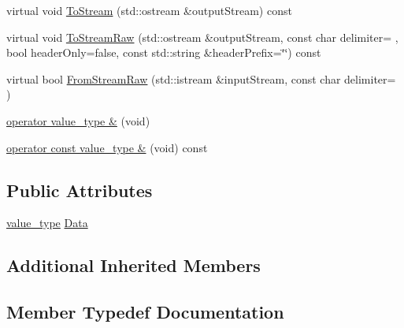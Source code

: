 \begin{DoxyCompactItemize}
virtual void \hyperlink{classmts_generic_object_proxy_a198823be05cc4e5e0af85d8a5f02d42a}{To\+Stream} (std\+::ostream \&output\+Stream) const 
\item 
virtual void \hyperlink{classmts_generic_object_proxy_a96c250631c96b2b63338e3304da78777}{To\+Stream\+Raw} (std\+::ostream \&output\+Stream, const char delimiter= \textquotesingle{} \textquotesingle{}, bool header\+Only=false, const std\+::string \&header\+Prefix=\char`\"{}\char`\"{}) const 
\item 
virtual bool \hyperlink{classmts_generic_object_proxy_a42a8b93d9101b6112b6845d5e42c3969}{From\+Stream\+Raw} (std\+::istream \&input\+Stream, const char delimiter= \textquotesingle{} \textquotesingle{})
\end{DoxyCompactItemize}
{\bf }\par
\begin{DoxyCompactItemize}
\item 
\hyperlink{classmts_generic_object_proxy_aef0697bd0bbbed1452a36e9fc9809905}{operator value\+\_\+type \&} (void)
\item 
\hyperlink{classmts_generic_object_proxy_aab317b5dc0c85123eaf55d3e4237bab5}{operator const value\+\_\+type \&} (void) const 
\end{DoxyCompactItemize}

\subsection*{Public Attributes}
\begin{DoxyCompactItemize}
\item 
\hyperlink{classmts_generic_object_proxy_a4c47d4b184e02d7443de1face033af34}{value\+\_\+type} \hyperlink{classmts_generic_object_proxy_a577e49255c24db1f0573c99de275b339}{Data}
\end{DoxyCompactItemize}
\subsection*{Additional Inherited Members}


\subsection{Member Typedef Documentation}
\hypertarget{classmts_generic_object_proxy_a8635f88c647c718cee6f7760529c27a5}{}
